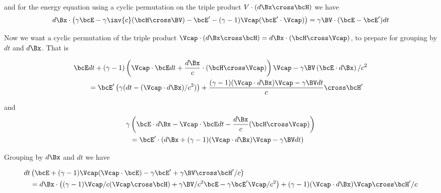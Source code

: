 and for the energy equation using a cyclic permutation on the triple product \(V \cdot (d\Bx \cross \bcH)\) we have
\begin{equation}\label{eqn:lorentz_force_tx_2:140}
\begin{aligned}
d\Bx \cdot \left( \gamma \bcE 
- \gamma \inv{c} (\bcH \cross \BV)
-\bcE' - (\gamma-1) \Vcap (\bcE' \cdot \Vcap)
\right)
= \gamma \BV \cdot (\bcE -\bcE')dt 
\end{aligned}
\end{equation}

Now we want a cyclic permutation of the triple product \(\Vcap \cdot (d\Bx \cross \bcH) = d\Bx \cdot (\bcH \cross \Vcap)\), to prepare for grouping by \(dt\) and \(d\Bx\).  That is

\begin{equation}\label{eqn:lorentz_force_tx_2:160}
\begin{aligned}
\bcE &dt 
+ (\gamma-1)\left(
\Vcap \cdot \bcE dt 
+\frac{d\Bx}{c} \cdot (\bcH \cross \Vcap)
\right) \Vcap - \gamma \BV \left( \bcE \cdot d\Bx \right)/c^2  \\
&=
\bcE' \left(\gamma ( dt - (\Vcap \cdot d\Bx )/c^2 )\right) + \frac{(\gamma-1)(\Vcap \cdot d\Bx) \Vcap - \gamma \BV dt}{c} \cross \bcH' 
\end{aligned}
\end{equation}

and
\begin{equation}\label{eqn:lorentz_force_tx_2:180}
\begin{aligned}
\gamma &\left( \bcE \cdot d\Bx - 
\Vcap \cdot \bcE dt 
-\frac{d\Bx}{c} (\bcH \cross \Vcap)
\right) \\
&=
\bcE' \cdot \left(d\Bx + (\gamma-1)(\Vcap \cdot d\Bx) \Vcap - \gamma \BV dt\right)
\end{aligned}
\end{equation}

Grouping by \(d\Bx\) and \(dt\) we have

\begin{equation}\label{eqn:lorentz_force_tx_2:200}
\begin{aligned}
dt &\left(
\bcE 
+ (\gamma-1) \Vcap (\Vcap \cdot \bcE)
- \gamma \bcE' 
+ \gamma \BV \cross \bcH'/c 
\right)
\\
&=
d\Bx \cdot \left(
(\gamma-1) \Vcap/c (\Vcap \cross \bcH)
+ \gamma \BV/c^2 \bcE 
- \gamma \bcE' \Vcap/c^2 
\right)
+ (\gamma-1)(\Vcap \cdot d\Bx) \Vcap \cross \bcH'/c
\end{aligned}
\end{equation}


